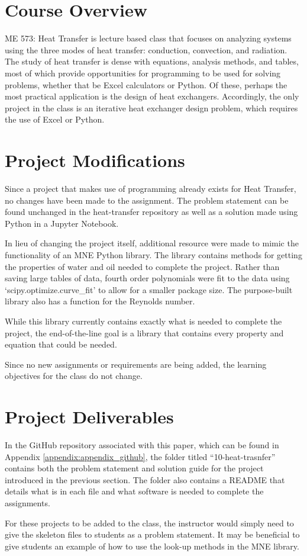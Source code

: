 \section{Course Overview}

ME 573: Heat Transfer is lecture based class that focuses on analyzing systems using
the three modes of heat transfer: conduction, convection, and radiation. The study of
heat transfer is dense with equations, analysis methods, and tables, most of which
provide opportunities for programming to be used for solving problems, whether that
be Excel calculators or Python. Of these, perhaps the most practical application 
is the design of heat exchangers. Accordingly, the only project in the class is an 
iterative heat exchanger design problem, which requires the use of Excel or Python.

\section{Project Modifications}

Since a project that makes use of programming already exists for Heat Transfer, no
changes have been made to the assignment. The problem statement can be found unchanged
in the heat-transfer repository as well as a solution made using Python in a Jupyter
Notebook.

In lieu of changing the project itself, additional resource were made to mimic the 
functionality of an MNE Python library. The library contains methods for getting 
the properties of water and oil needed to complete the project. Rather than saving
large tables of data, fourth order polynomials were fit to the data using 
`scipy.optimize.curve\_fit' to allow for a smaller package size. The purpose-built
library also has a function for the Reynolds number. 

While this library currently contains exactly what is needed to complete the project,
the end-of-the-line goal is a library that contains every property and equation that
could be needed.

Since no new assignments or requirements are being added, the learning objectives
for the class do not change. 

\section{Project Deliverables}

In the GitHub repository associated with this paper, which can be found in 
Appendix \ref{appendix:appendix_github}, the folder titled ``10-heat-trasnfer''
contains both the problem statement and solution guide for the project introduced in 
the previous section. The folder also contains a README that details what is in each file and 
what software is needed to complete the assignments. 

For these projects to be added to the class, the instructor would simply need to give the 
skeleton files to students as a problem statement. It may be beneficial to give students 
an example of how to use the look-up methods in the MNE library. 
